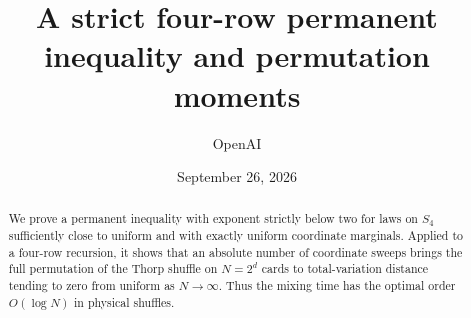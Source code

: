 \documentclass[11pt]{article}
\title{A strict four-row permanent inequality and permutation moments}
\author{OpenAI}
\date{September 26, 2026}
\theoremstyle{remark}\newtheorem{remark}[theorem]{Remark}
\begin{document}
\maketitle
\begin{abstract}
We prove a permanent inequality with exponent strictly below two for laws on $S_4$ sufficiently close to uniform and with exactly uniform coordinate marginals. Applied to a four-row recursion, it shows that an absolute number of coordinate sweeps brings the full permutation of the Thorp shuffle on $N=2^d$ cards to total-variation distance tending to zero from uniform as $N\to\infty$. Thus the mixing time has the optimal order $O(\log N)$ in physical shuffles.
\end{abstract}







\begingroup\small


\endgroup
\end{document}
